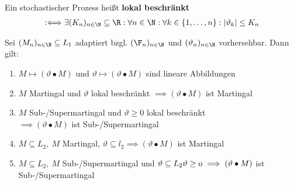 \begin{defi} %
Ein stochastischer Prozess heißt \textbf{lokal beschränkt}
\begin{align*}
:\Longleftrightarrow\exists(K_n)_{n\in\N}\subseteq\R:\forall n\in\N:\forall k\in\lbrace1,\ldots,n\rbrace:|\vartheta_k|\leq K_n
\end{align*}
\end{defi}

\begin{theorem}\label{theorem2.5}
Sei $(M_n)_{n\in\N}\subseteq L_1$ adaptiert bzgl. $(\F_n)_{n\in\N}$ und $(\vartheta_n)_{n\in\N}$ vorhersehbar. Dann gilt:

\begin{enumerate}[label=(\alph*)]
\item $M\mapsto(\vartheta\bullet M)$ und $\vartheta\mapsto(\vartheta\bullet M)$ sind lineare Abbildungen
\item $M$ Martingal und $\vartheta$ lokal beschränkt $\implies(\vartheta\bullet M)$ ist Martingal
\item $M$ Sub-/Supermartingal und $\vartheta\geq0$ lokal beschränkt\\ $\implies(\vartheta\bullet M)$ ist Sub-/Supermartingal
\item $M\subseteq L_2,~M$ Martingal, $\vartheta\subseteq l_2\implies(\vartheta\bullet M)$ ist Martingal
\item $M\subseteq L_2,~M$ Sub-/Supermartingal und $\vartheta\subseteq L_2\mit\vartheta\geq0\\\implies(\vartheta\bullet M)$ ist Sub-/Supermartingal
\end{enumerate}
\end{theorem}

